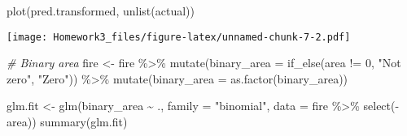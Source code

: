 \documentclass[
]{article}
\newenvironment{Shaded}{\begin{snugshade}}{\end{snugshade}}
\newcommand{\AttributeTok}[1]{\textcolor[rgb]{0.77,0.63,0.00}{#1}}
\newcommand{\CommentTok}[1]{\textcolor[rgb]{0.56,0.35,0.01}{\textit{#1}}}
\newcommand{\DecValTok}[1]{\textcolor[rgb]{0.00,0.00,0.81}{#1}}
\newcommand{\FunctionTok}[1]{\textcolor[rgb]{0.00,0.00,0.00}{#1}}
\newcommand{\NormalTok}[1]{#1}
\newcommand{\OtherTok}[1]{\textcolor[rgb]{0.56,0.35,0.01}{#1}}
\newcommand{\SpecialCharTok}[1]{\textcolor[rgb]{0.00,0.00,0.00}{#1}}
\newcommand{\StringTok}[1]{\textcolor[rgb]{0.31,0.60,0.02}{#1}}
\begin{document}
\begin{Shaded}
\begin{Highlighting}[]
\FunctionTok{plot}\NormalTok{(pred.transformed, }\FunctionTok{unlist}\NormalTok{(actual))}
\end{Highlighting}
\end{Shaded}

\texttt{[image: Homework3\_files/figure-latex/unnamed-chunk-7-2.pdf]}

\begin{Shaded}
\begin{Highlighting}[]
\CommentTok{\# Binary area}
\NormalTok{fire }\OtherTok{\textless{}{-}}\NormalTok{ fire }\SpecialCharTok{\%\textgreater{}\%} 
  \FunctionTok{mutate}\NormalTok{(}\AttributeTok{binary\_area =} \FunctionTok{if\_else}\NormalTok{(area }\SpecialCharTok{!=} \DecValTok{0}\NormalTok{, }\StringTok{"Not zero"}\NormalTok{, }\StringTok{"Zero"}\NormalTok{)) }\SpecialCharTok{\%\textgreater{}\%} 
  \FunctionTok{mutate}\NormalTok{(}\AttributeTok{binary\_area =} \FunctionTok{as.factor}\NormalTok{(binary\_area))}

\NormalTok{glm.fit }\OtherTok{\textless{}{-}} \FunctionTok{glm}\NormalTok{(binary\_area }\SpecialCharTok{\textasciitilde{}}\NormalTok{ ., }\AttributeTok{family =} \StringTok{"binomial"}\NormalTok{, }\AttributeTok{data =}\NormalTok{ fire }\SpecialCharTok{\%\textgreater{}\%} \FunctionTok{select}\NormalTok{(}\SpecialCharTok{{-}}\NormalTok{area))}
\FunctionTok{summary}\NormalTok{(glm.fit)}
\end{Highlighting}
\end{Shaded}
\end{document}
